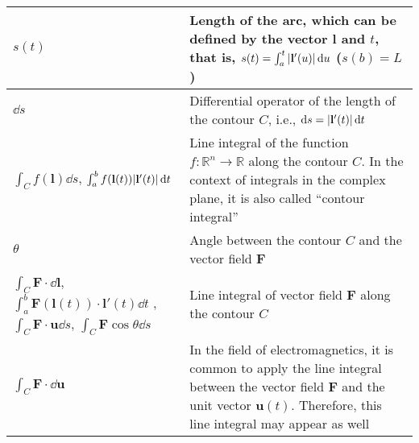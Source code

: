 \documentclass{article}
\begin{document}
\begin{xltabular}{\textwidth}{XX}
	\(s(t)\)                                                                                                                                                                                                                                   & Length of the arc, which can be defined by the vector \(\mathbf{l}\) and \(t\), that is, \(s(t) = \int_a^t \abs{\mathbf{l}'(u)} \dd{u}\) (\(s(b) = L\))\cite{stewartCalculus2011}                                                                                                                                                   \\ \hline
	\(\dd{s}\)                                                                                                                                                                                                                                 & Differential operator of the length of the contour \(C\), i.e., \(\dd{s} = \abs{\mathbf{l}'(t)} \dd{t}\) \cite{stewartCalculus2011}                                                                                                                                                                                                 \\ \hline
	\(\int_C f(\mathbf{l}) \dd{s}\), \(\int_a^b f(\mathbf{l}(t)) \abs{\mathbf{l}'(t)} \dd{t}\)                                                                                                                                                     & Line integral of the function \(f: \mathbb{R}^{n} \rightarrow \mathbb{R}\) along the contour \(C\). In the context of integrals in the complex plane, it is also called ``contour integral'' \\ \hline
    \(\theta\) \cite{ramoFieldsWavesCommunication1994} & Angle between the contour \(C\) and the vector field \(\mathbf{F}\) \\ \hline
	\(\int_C \mathbf{F}\cdot\dd{\mathbf{l}}\), \(\int_a^b \mathbf{F}(\mathbf{l}(t)) \cdot \mathbf{l}'(t) \dd{t}\) \cite{apostolCalculus2ndEdn1967,stewartCalculus2011}, \(\int_C \mathbf{F}\cdot\mathbf{u} \dd{s}\), \(\int_C \mathbf{F} \cos{\theta} \dd{s}\) \cite{ramoFieldsWavesCommunication1994}                                                                                         & Line integral of vector field \(\mathbf{F}\) along the contour \(C\)                                                                                                                                                                                                          \\ \hline
	\(\int_C \mathbf{F}\cdot\dd{\mathbf{u}}\) \cite{ramoFieldsWavesCommunication1994}                                                                                         & In the field of electromagnetics, it is common to apply the line integral between the vector field \(\mathbf{F}\) and the unit vector \(\mathbf{u}(t)\). Therefore, this line integral may appear as well                                                                                                                                                                                                            \\ \hline

\end{xltabular}
\end{document}
